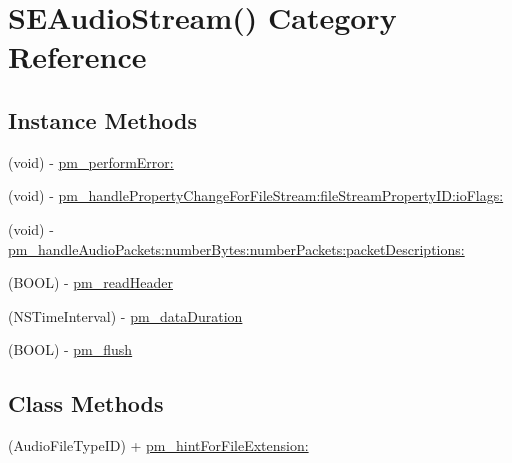 \hypertarget{category_s_e_audio_stream_07_08}{\section{S\-E\-Audio\-Stream() Category Reference}
\label{category_s_e_audio_stream_07_08}
}
\subsection*{Instance Methods}
\begin{DoxyCompactItemize}
\item 
(void) -\/ \hyperlink{category_s_e_audio_stream_07_08_ad24e56ffa5a11921036f512b30c2e61d}{pm\-\_\-perform\-Error\-:}
\item 
(void) -\/ \hyperlink{category_s_e_audio_stream_07_08_a9e38c18656273234be61619aafa089e6}{pm\-\_\-handle\-Property\-Change\-For\-File\-Stream\-:file\-Stream\-Property\-I\-D\-:io\-Flags\-:}
\item 
(void) -\/ \hyperlink{category_s_e_audio_stream_07_08_a0e5ee17bc631e7b9b6cc2d710d855d1d}{pm\-\_\-handle\-Audio\-Packets\-:number\-Bytes\-:number\-Packets\-:packet\-Descriptions\-:}
\item 
(B\-O\-O\-L) -\/ \hyperlink{category_s_e_audio_stream_07_08_aa7990eeb00de4c75445968be37c3fb6c}{pm\-\_\-read\-Header}
\item 
(N\-S\-Time\-Interval) -\/ \hyperlink{category_s_e_audio_stream_07_08_a6d445c53ea91dc93dc816d869a0920ca}{pm\-\_\-data\-Duration}
\item 
(B\-O\-O\-L) -\/ \hyperlink{category_s_e_audio_stream_07_08_a70ebad17a61f0c4638e165b1ab698f12}{pm\-\_\-flush}
\end{DoxyCompactItemize}
\subsection*{Class Methods}
\begin{DoxyCompactItemize}
\item 
(Audio\-File\-Type\-I\-D) + \hyperlink{category_s_e_audio_stream_07_08_a12c6083989cd11b11dbd2358af3db5b1}{pm\-\_\-hint\-For\-File\-Extension\-:}
\end{DoxyCompactItemize}
